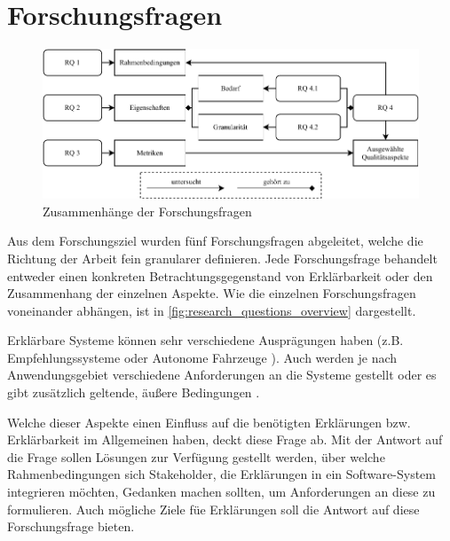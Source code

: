 \section{Forschungsfragen}

\begin{figure}[htb!]
    \includegraphics[width=\textwidth]{contents/03_research_design/res/research_questions_overview.pdf}
    \caption{Zusammenhänge der Forschungsfragen}
    \label{fig:research_questions_overview}
\end{figure}

Aus dem Forschungsziel wurden fünf Forschungsfragen abgeleitet, welche die Richtung der Arbeit fein granularer definieren. Jede Forschungsfrage behandelt entweder einen konkreten Betrachtungsgegenstand von Erklärbarkeit oder den Zusammenhang der einzelnen Aspekte. Wie die einzelnen Forschungsfragen voneinander abhängen, ist in \autoref{fig:research_questions_overview} dargestellt.

\smallskip

\noindent{}

\smallskip

Erklärbare Systeme können sehr verschiedene Ausprägungen haben (z.B. Empfehlungssysteme \cite{kunkel_let_2019} oder Autonome Fahrzeuge \cite{wiegand2019drive}). Auch werden je nach Anwendungsgebiet verschiedene Anforderungen an die Systeme gestellt oder es gibt zusätzlich geltende, äußere Bedingungen \cite{chazette_knowledge_nodate}.

Welche dieser Aspekte einen Einfluss auf die benötigten Erklärungen bzw. Erklärbarkeit im Allgemeinen haben, deckt diese Frage ab. Mit der Antwort auf die Frage sollen Lösungen zur Verfügung gestellt werden, über welche Rahmenbedingungen sich Stakeholder, die Erklärungen in ein Software-System integrieren möchten, Gedanken machen sollten, um Anforderungen an diese zu formulieren. Auch mögliche Ziele füe Erklärungen soll die Antwort auf diese Forschungsfrage bieten. 

